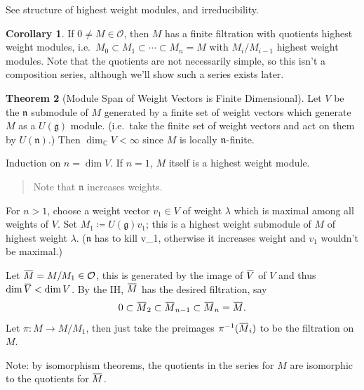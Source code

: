 \documentclass[11pt]{scrartcl}
\theoremstyle{definition}
\theoremstyle{theorem}
\newtheorem{theorem}{Theorem}[section]
\newtheorem{corollary}[theorem]{Corollary}
\theoremstyle{proof}
\newenvironment{proof}
{\pushQED{$\qed$}\pf}
{\par\popQED\endpf}
\theoremstyle{definition}
\theoremstyle{break}
\theoremstyle{problem}
\newcommand{\CC}[0]{{\mathbb{C}}}
\newcommand{\dash}[0]{{\hbox{-}}}
\newcommand{\definedas}[0]{\coloneqq}
\newcommand{\inv}[0]{^{-1}}
\newcommand{\lieg}[0]{{\mathfrak{g}}}
\newcommand{\lien}[0]{{\mathfrak{n}}}
\renewcommand{\bar}[1]{\mkern 1.5mu\overline{\mkern-1.5mu#1\mkern-1.5mu}\mkern 1.5mu}
\renewcommand{\qed}[0]{\hfill\blacksquare}
\renewcommand{\to}[0]{\longrightarrow}
\begin{document}
See structure of highest weight modules, and irreducibility.

\begin{corollary}

If \(0 \neq M\in\mathcal O\), then \(M\) has a finite filtration with
quotients highest weight modules,
i.e.~\(M_0 \subset M_1 \subset \cdots \subset M_n = M\) with
\(M_i/M_{i-1}\) highest weight modules. Note that the quotients are not
necessarily simple, so this isn't a composition series, although we'll
show such a series exists later.\end{corollary}

\begin{theorem}[Module Span of Weight Vectors is Finite Dimensional]

Let \(V\) be the \(\lien\) submodule of \(M\) generated by a finite set
of weight vectors which generate \(M\) as a \(U(\lieg)\) module.
(i.e.~take the finite set of weight vectors and act on them by
\(U(\lien)\).) Then \(\dim_\CC V < \infty\) since \(M\) is locally
\(\lien\dash\)finite.\end{theorem}

\begin{proof}

Induction on \(n = \dim V\). If \(n=1\), \(M\) itself is a highest
weight module.

\begin{quote}
Note that \(\lien\) increases weights.
\end{quote}

For \(n > 1\), choose a weight vector \(v_1 \in V\) of weight
\(\lambda\) which is maximal among all weights of \(V\). Set
\(M_1 \definedas U(\lieg) v_1\); this is a highest weight submodule of
\(M\) of highest weight \(\lambda\). (\(\lien\) has to kill v\_1,
otherwise it increases weight and \(v_1\) wouldn't be maximal.)

Let \(\bar M = M/M_1 \in \mathcal O\), this is generated by the image of
\(\bar V\) of \(V\) and thus \(\dim \bar V < \dim V\). By the IH,
\(\bar M\) has the desired filtration, say
\begin{align*}0 \subset \bar M_2 \subset \bar M_{n-1} \subset \bar M_n = \bar M.\end{align*}
Let \(\pi: M \to M/M_1\), then just take the preimages
\(\pi\inv(\bar M_i)\) to be the filtration on \(M\).\end{proof}

Note: by isomorphism theorems, the quotients in the series for \(M\) are
isomorphic to the quotients for \(\bar M\).
\end{document}
